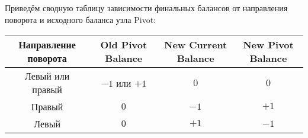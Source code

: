 \begin{frame}

    Приведём сводную таблицу зависимости финальных балансов от направления поворота и исходного баланса узла Pivot:

    \begin{table*}[ht]
        \centering
    
        \begin{tabular}{|c|c|c|c|}
            \hline
            Направление поворота & Old Pivot Balance & New Current Balance & New Pivot Balance \\
            \hline
                Левый или правый &   $-1$ или $+1$   &         $0$         &        $0$        \\
            \hline
                          Правый &        $0$        &         $-1$        &        $+1$       \\
            \hline
                           Левый &        $0$        &         $+1$        &        $-1$       \\
            \hline
        \end{tabular}
    
    \end{table*}

\end{frame}
